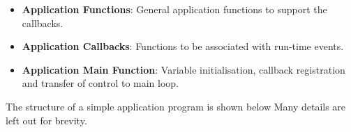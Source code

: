 \documentclass[11pt,a4paper,twoside]{article}
\begin{document}
\begin{itemize}
\item \textbf{Application Functions}: General application functions to support the callbacks.
\item \textbf{Application Callbacks}: Functions to be associated with run-time events.
\item \textbf{Application Main Function}: Variable initialisation, callback registration and transfer of control to main loop.
\end{itemize}

The structure of a simple application program is shown below
Many details are left out for brevity.

\pagebreak

\end{document}
